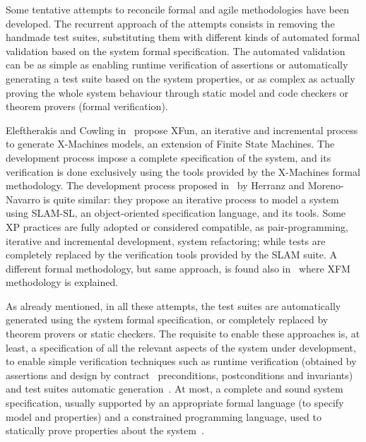 \documentclass{article}
\begin{document}
Some tentative attempts to reconcile formal and agile methodologies have been developed.
The recurrent approach of the attempts consists in removing the handmade test suites, substituting them with different kinds of automated formal validation based on the system formal specification. 
The automated validation can be as simple as enabling runtime verification of assertions or automatically generating a test suite based on the system properties, or as complex as actually proving the whole system behaviour through static model and code checkers or theorem provers (formal verification).

Eleftherakis and Cowling in~\cite{Eleftherakis2003} propose XFun, an iterative and incremental process to generate X-Machines models, an extension of Finite State Machines. 
The development process impose a complete specification of the system, and its verification is done exclusively using the tools provided by the X-Machines formal methodology. 
The development process proposed in~\cite{Herranz2003b} by Herranz and Moreno-Navarro is quite similar: they propose an iterative process to model a system using SLAM-SL, an object-oriented specification language, and its tools. 
Some XP practices are fully adopted or considered compatible, as pair-programming, iterative and incremental development, system refactoring; while tests are completely replaced by the verification tools provided by the SLAM suite.
A different formal methodology, but same approach, is found also in~\cite{Suhaib2005} where XFM methodology is explained.

As already mentioned, in all these attempts, the test suites are automatically generated using the system formal specification, or completely replaced by theorem provers or static checkers. 
The requisite to enable these approaches is, at least, a specification of all the relevant aspects of the system under development, to enable simple verification techniques such as runtime verification (obtained by assertions and design by contract~\cite{Meyer1997} preconditions, postconditions and invariants) and test suites automatic generation~\cite{Cheon2002,Cheon2004,Cheon2005}.
At most, a complete and sound system specification, usually supported by an appropriate formal language (to specify model and properties) and a constrained programming language, used to statically prove properties about the system~\cite{CatanoHuisman02,DetlefsNelsonSaxe2005,KiniryCok04}.
\end{document}
